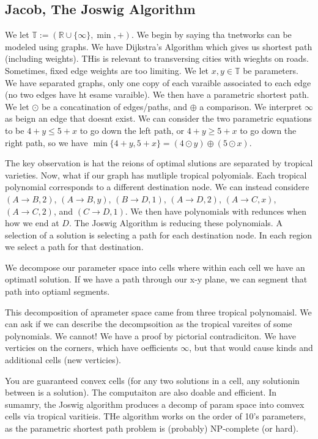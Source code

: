 \documentclass[11pt]{article}
\theoremstyle{definition}
\theoremstyle{plain}%
\theoremstyle{definition}
\def\RR{{\mathbb R}}
\def\TT{{\mathbb T}}
\begin{document}
\subsection{Jacob, The Joswig Algorithm}


We let $\TT:=(\RR\cup\{\infty\}, \min, +)$. We begin by saying tha tnetworks can be modeled using graphs. We have Dijkstra's Algorithm which gives us shortest path (including weights). THis is relevant to transversing cities with wieghts on roads. Sometimes, fixed edge weights are too limiting. We let $x,y \in \TT$ be parameters. We have separated graphs, only one copy of each varaible associated to each edge (no two edges have ht esame varaible). We then have  a parametric shortest path. We let $\odot$ be a concatination of edges/paths, and $\oplus$ a comparison. We interpret $\infty$ as beign an edge that doesnt exist. We can consider the two parametric equations to be $4+y \leq 5+x$ to go down the left path, or $4+y \geq 5+x$ to go down the right path, so we have $\min\{4+y,5+x\} = (4\odot y) \oplus (5\odot x)$.

The key observation is hat the reions of optimal slutions are separated by tropical varieties. Now, what if our graph has mutliple tropical polyomials. Each tropical polynomial corresponds to a different destination node. We can instead considere $(A\rightarrow B,2)$, $(A\rightarrow B,y)$, $(B\rightarrow D,1)$, $(A\rightarrow D,2 )$, $(A \rightarrow C, x)$, $(A \rightarrow C,2)$, and $(C \rightarrow D,1)$. We then have polynomials with redunces when how we end at $D$. The Joswig Algorithm is reducing these polynomials. A selection of a solution is selecting a path for each destination node. In each region we select a path for that destination. 

We decompose our parameter space into cells where within each cell we have an optimatl solution. If we have a path through our x-y plane, we can segment that path into optiaml segments.


This decomposition of aprameter space came from three tropical polynomaisl. We can ask if we can describe the decompsoition as the tropical vareites of some polynomials. We cannot! We have a proof by pictorial contradiciton. We have verticies on the corners, which have oefficients $\infty$, but that would cause kinds and additional cells (new verticies).


You are guaranteed convex cells (for any two solutions in a cell, any solutionin between is a solution). The computaiton are also doable and efficient. In sumamry, the Joswig algorithm produces a decomp of param space into comvex cells via tropical varitieis. THe algorithm works on the order of 10's parameters, as the parametric shortest path problem is (probably) NP-complete (or hard).
\end{document}
